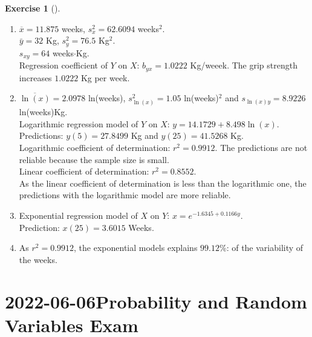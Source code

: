 \documentclass[
  a4paper,
]{scrreport}
\theoremstyle{definition}
\newtheorem{exercise}{Exercise}[chapter]
\theoremstyle{remark}
\begin{document}
\begin{exercise}[]
\begin{tcolorbox}
\begin{enumerate}
\def\labelenumi{\alph{enumi}.}
\item
  \(\overline{x}=11.875\) weeks, \(s_x^2=62.6094\) weeks\(^2\).\\
  \(\bar y=32\) Kg, \(s_y^2=76.5\) Kg\(^2\).\\
  \(s_{xy}=64\) weeks\(\cdot\)Kg.\\
  Regression coefficient of \(Y\) on \(X\): \(b_{yx} = 1.0222\)
  Kg/weeek. The grip strength increases \(1.0222\) Kg per week.
\item
  \(\overline{\ln(x)} = 2.0978\) ln(weeks), \(s_{\ln(x)}^2 = 1.05\)
  ln(weeks)\(^2\) and \(s_{\ln(x)y} = 8.9226\) ln(weeks)Kg.\\
  Logarithmic regression model of \(Y\) on \(X\):
  \(y = 14.1729 + 8.498 \ln(x)\).\\
  Predictions: \(y(5) = 27.8499\) Kg and \(y(25) = 41.5268\) Kg.\\
  Logarithmic coefficient of determination: \(r^2 = 0.9912\). The
  predictions are not reliable because the sample size is small.\\
  Linear coefficient of determination: \(r^2 = 0.8552\).\\
  As the linear coefficient of determination is less than the
  logarithmic one, the predictions with the logarithmic model are more
  reliable.
\item
  Exponential regression model of \(X\) on \(Y\):
  \(x = e^{-1.6345 + 0.1166y}\).\\
  Prediction: \(x(25)=3.6015\) Weeks.
\item
  As \(r^2 = 0.9912\), the exponential models explains \(99.12\)\%: of
  the variability of the weeks.\\
\end{enumerate}

\end{tcolorbox}

\end{exercise}


\hypertarget{probability-and-random-variables-exam-1}{%
\chapter{\texorpdfstring{2022-06-06Probability and Random Variables
Exam}{2022-06-06 Probability and Random Variables Exam}}\label{probability-and-random-variables-exam-1}}
\end{document}
